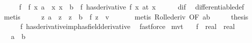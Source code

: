 \begin{isabellebody}
%
\isadelimproof
%
\endisadelimproof
%
\isatagproof
{}\isamarkupfalse%
\ {\isacharminus}{\kern0pt}\isanewline
\ \ \isamarkupfalse%
\ f{\isacharprime}{\kern0pt}\ \ f{\isacharprime}{\kern0pt}{\isacharcolon}{\kern0pt}\ {\isachardoublequoteopen}{\isasymAnd}x{\isachardot}{\kern0pt}\ {\isasymlbrakk}a\ {\isacharless}{\kern0pt}\ x{\isacharsemicolon}{\kern0pt}\ x\ {\isacharless}{\kern0pt}\ b{\isasymrbrakk}\ {\isasymLongrightarrow}\ {\isacharparenleft}{\kern0pt}f\ has{\isacharunderscore}{\kern0pt}derivative\ f{\isacharprime}{\kern0pt}\ x{\isacharparenright}{\kern0pt}\ {\isacharparenleft}{\kern0pt}at\ x{\isacharparenright}{\kern0pt}{\isachardoublequoteclose}\isanewline
\ \ \ \ \isamarkupfalse%
\ dif\ \isamarkupfalse%
\ differentiable{\isacharunderscore}{\kern0pt}def\ \isamarkupfalse%
\ metis\isanewline
\ \ \isamarkupfalse%
\ \isamarkupfalse%
\ {\isachardoublequoteopen}{\isasymexists}z{\isachardot}{\kern0pt}\ a\ {\isacharless}{\kern0pt}\ z\ {\isasymand}\ z\ {\isacharless}{\kern0pt}\ b\ {\isasymand}\ f{\isacharprime}{\kern0pt}\ z\ {\isacharequal}{\kern0pt}\ {\isacharparenleft}{\kern0pt}{\isasymlambda}v{\isachardot}{\kern0pt}\ {}{\isacharparenright}{\kern0pt}{\isachardoublequoteclose}\isanewline
\ \ \ \ \isamarkupfalse%
\ {\isacharparenleft}{\kern0pt}metis\ Rolle{\isacharunderscore}{\kern0pt}deriv\ {\isacharbrackleft}{\kern0pt}OF\ ab{\isacharbrackright}{\kern0pt}{\isacharparenright}{\kern0pt}\isanewline
\ \ \isamarkupfalse%
\ \isamarkupfalse%
\ {\isacharquery}{\kern0pt}thesis\isanewline
\ \ \ \ \isamarkupfalse%
\ f{\isacharprime}{\kern0pt}\ has{\isacharunderscore}{\kern0pt}derivative{\isacharunderscore}{\kern0pt}imp{\isacharunderscore}{\kern0pt}has{\isacharunderscore}{\kern0pt}field{\isacharunderscore}{\kern0pt}derivative\ \isamarkupfalse%
\ fastforce\isanewline
{}\isamarkupfalse%
%
\endisatagproof
{\isafoldproof}%
%
\isadelimproof
%
\endisadelimproof
%
\isadelimdocument
%
\endisadelimdocument
%
\isatagdocument
%
\isamarkuptrue%
%
\endisatagdocument
{\isafolddocument}%
%
\isadelimdocument
%
\endisadelimdocument
{}\isamarkupfalse%
\ mvt{\isacharcolon}{\kern0pt}\isanewline
\ \ \ f\ {\isacharcolon}{\kern0pt}{\isacharcolon}{\kern0pt}\ {\isachardoublequoteopen}real\ {\isasymRightarrow}\ real{\isachardoublequoteclose}\isanewline
\ \ \ {\isachardoublequoteopen}a\ {\isacharless}{\kern0pt}\ b{\isachardoublequoteclose}\isanewline

\end{isabellebody}
